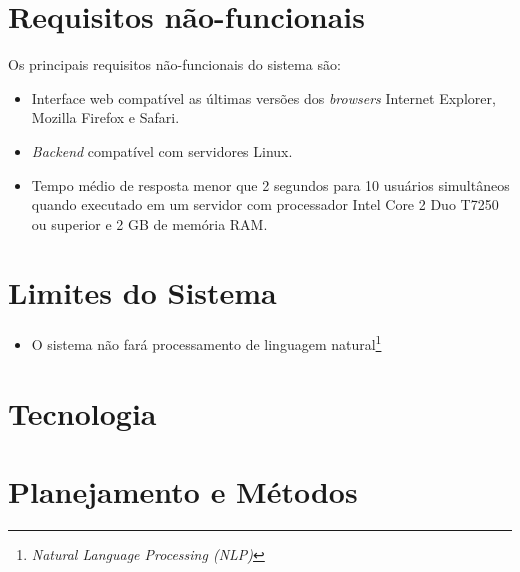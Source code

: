\section{Requisitos não-funcionais}

Os principais requisitos não-funcionais do sistema são:

\begin{itemize}

    \item Interface web compatível as últimas versões dos \textit{browsers} Internet Explorer, Mozilla Firefox e Safari.
    
    \item \textit{Backend} compatível com servidores Linux.

    \item Tempo médio de resposta menor que 2 segundos para 10 usuários simultâneos quando executado em um servidor com processador Intel Core 2 Duo T7250 ou superior e 2 GB de memória RAM. %

\end{itemize}

\section{Limites do Sistema}

\begin{itemize}
  
    \item O sistema não fará processamento de linguagem natural\footnote{\textit{Natural Language Processing (NLP)}}

\end{itemize}

\section{Tecnologia} %
\label{sec:tecnologia}


\section{Planejamento e Métodos} %
\label{sec:planejamento_e_métodos}




